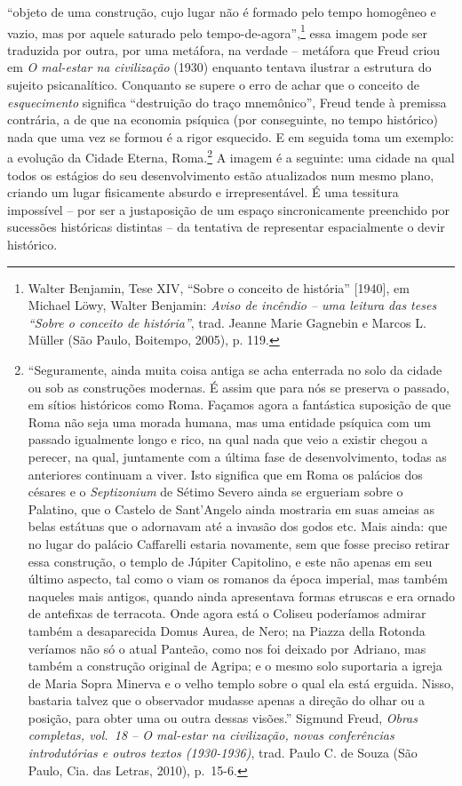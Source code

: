 ``objeto de uma construção, cujo lugar não é formado pelo tempo
homogêneo e vazio, mas por aquele saturado pelo
tempo-de-agora'',\footnote{Walter Benjamin, Tese XIV, ``Sobre o conceito
  de história'' {[}1940{]}, em Michael Löwy, Walter Benjamin:
  \emph{Aviso de incêndio -- uma leitura das teses ``Sobre o conceito de
  história''}, trad. Jeanne Marie Gagnebin e Marcos L. Müller (São
  Paulo, Boitempo, 2005), p. 119.} essa imagem pode ser traduzida por
outra, por uma metáfora, na verdade -- metáfora que Freud criou em
\emph{O mal-estar na civilização} (1930) enquanto tentava ilustrar a
estrutura do sujeito psicanalítico. Conquanto se supere o erro de achar
que o conceito de \emph{esquecimento} significa ``destruição do traço
mnemônico'', Freud tende à premissa contrária, a de que na economia
psíquica (por conseguinte, no tempo histórico) nada que uma vez se
formou é a rigor esquecido. E em seguida toma um exemplo: a evolução da
Cidade Eterna, Roma.\footnote{``Seguramente, ainda muita coisa antiga se
  acha enterrada no solo da cidade ou sob as construções modernas. É
  assim que para nós se preserva o passado, em sítios históricos como
  Roma. Façamos agora a fantástica suposição de que Roma não seja uma
  morada humana, mas uma entidade psíquica com um passado igualmente
  longo e rico, na qual nada que veio a existir chegou a perecer, na
  qual, juntamente com a última fase de desenvolvimento, todas as
  anteriores continuam a viver. Isto significa que em Roma os palácios
  dos césares e o \emph{Septizonium} de Sétimo Severo ainda se ergueriam
  sobre o Palatino, que o Castelo de Sant'Angelo ainda mostraria em suas
  ameias as belas estátuas que o adornavam até a invasão dos godos etc.
  Mais ainda: que no lugar do palácio Caffarelli estaria novamente, sem
  que fosse preciso retirar essa construção, o templo de Júpiter
  Capitolino, e este não apenas em seu último aspecto, tal como o viam
  os romanos da época imperial, mas também naqueles mais antigos, quando
  ainda apresentava formas etruscas e era ornado de antefixas de
  terracota. Onde agora está o Coliseu poderíamos admirar também a
  desaparecida Domus Aurea, de Nero; na Piazza della Rotonda veríamos
  não só o atual Panteão, como nos foi deixado por Adriano, mas também a
  construção original de Agripa; e o mesmo solo suportaria a igreja de
  Maria Sopra Minerva e o velho templo sobre o qual ela está erguida.
  Nisso, bastaria talvez que o observador mudasse apenas a direção do
  olhar ou a posição, para obter uma ou outra dessas visões.'' Sigmund
  Freud, \emph{Obras completas, vol.~18 -- O mal-estar na civilização,
  novas conferências introdutórias e outros textos (1930-1936)}, trad.
  Paulo C. de Souza (São Paulo, Cia. das Letras, 2010), p.~15-6.} A
imagem é a seguinte: uma cidade na qual todos os estágios do seu
desenvolvimento estão atualizados num mesmo plano, criando um lugar
fisicamente absurdo e irrepresentável. É uma tessitura impossível -- por
ser a justaposição de um espaço sincronicamente preenchido por sucessões
históricas distintas -- da tentativa de representar espacialmente o
devir histórico.

